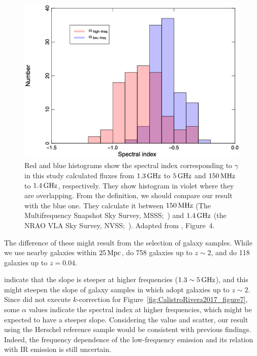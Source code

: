 \begin{figure}[htbp]
	\centering
	\includegraphics[width=.8\linewidth]{Chapter_6/Figures/Chyzy2018_Figure4.png}
    \caption[The histogram of the spectral index in \citet{Chyzy2018}]{\label{fig:Chyzy2018_figure4}
        Red and blue histograms show the spectral index corresponding to $\gamma$ in this study calculated fluxes from $1.3\,\mathrm{GHz}$ to $5\,\mathrm{GHz}$ and $150\,\mathrm{MHz}$ to $1.4\,\mathrm{GHz}$, respectively.
        They show histogram in violet where they are overlapping.
        From the definition, we should compare our result with the blue one.
        They calculate it between $150\,\mathrm{MHz}$ (The Multifrequency Snapshot Sky Survey, MSSS;~\citealt{Heald2015}) and $1.4\,\mathrm{GHz}$ (the NRAO VLA Sky Survey, NVSS;~\citealt{Condon1998}).
        Adapted from \citealt{Chyzy2018}, Figure~4.
    }
\end{figure}

The difference of these might result from the selection of galaxy samples.
While we use nearby galaxies within $25\,\mathrm{Mpc}$, \citet{CalistroRivera2017a} do 758 galaxies up to $z\sim2$, and \citet{Chyzy2018} do 118 galaxies up to $z=0.04$.

\citet{Chyzy2018} indicate that the slope is steeper at higher frequencies ($1.3 \sim 5\,\mathrm{GHz}$), and this might steepen the slope of galaxy samples in \citet{CalistroRivera2017a} which adopt galaxies up to $z\sim2$.
Since \citet{CalistroRivera2017a} did not execute $k$-correction for Figure~\ref{fig:CalistroRivera2017_figure7}, some $\alpha$ values indicate the spectral index at higher frequencies, which might be expected to have a steeper slope.
Considering the value and scatter, our result using the Herschel reference sample would be consistent with previous findings.
Indeed, the frequency dependence of the low-frequency emission and its relation with IR emission is still uncertain.



